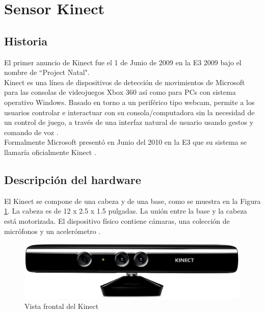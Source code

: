 \section{Sensor Kinect}
\subsection{Historia}
El primer anuncio de Kinect fue el 1 de Junio de 2009 en la E3 2009 bajo el nombre de ``Project Natal".\\

Kinect es una línea de dispositivos de detección de movimientos de Microsoft para las consolas de videojuegos Xbox 360 así como para PCs con sistema operativo Windows. Basado en torno a un periférico tipo webcam, permite a los usuarios controlar e interactuar con su consola/computadora sin la necesidad de un control de juego, a través de una interfaz natural de usuario usando gestos y comando de voz \cite{Microsoft2}.\\

Formalmente Microsoft presentó en Junio del 2010 en la E3 que su sistema se llamaría oficialmente Kinect \cite{Snider}.
\subsection{Descripción del hardware}
El Kinect se compone de una cabeza y de una base, como se muestra en la Figura \ref{fig:Kinect}. La cabeza es de 12 x 2.5 x 1.5 pulgadas. La unión entre la base y la cabeza está motorizada. El dispositivo físico contiene cámaras, una colección de micrófonos y un acelerómetro \cite{Webb}.

\begin{figure}[h]%
	\begin{center}
		\includegraphics[scale=0.15]{./Figuras/KinectFrontal}
	\end{center}
	\caption{Vista frontal del Kinect}
	\label{fig:Kinect}
\end{figure}

